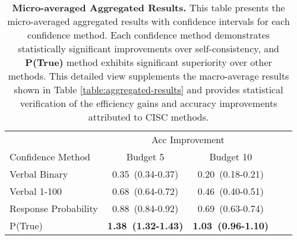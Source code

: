 \begin{table*}[!ht]
\centering
\begin{tabular}{lcccc}
\toprule
& \multicolumn{2}{c}{Acc Improvement} \\
\cmidrule(lr){2-3} \cmidrule(l){4-5} 
Confidence Method & Budget 5 & Budget 10 \\
\midrule
Verbal Binary & 0.35\ \small{(0.34-0.37)} & 0.20\ \small{(0.18-0.21)} \\[4pt]
Verbal 1-100 & 0.68\ \small{(0.64-0.72)} & 0.46\ \small{(0.40-0.51)} \\[4pt]
Response Probability & 0.88\ \small{(0.84-0.92)} & 0.69\ \small{(0.63-0.74)} \\[4pt]
P(True) & \textbf{1.38\ \small{(1.32-1.43)}} & \textbf{1.03\ \small{(0.96-1.10)}} \\[4pt]

\bottomrule
\end{tabular}
\caption{\textbf{Micro-averaged Aggregated Results. } This table presents the micro-averaged aggregated results with confidence intervals for each confidence method. Each confidence method demonstrates statistically significant improvements over self-consistency, and \textbf{P(True)} method exhibits significant superiority over other methods. This detailed view supplements the macro-average results shown in Table \ref{table:aggregated-results} and provides statistical verification of the efficiency gains and accuracy improvements attributed to CISC methods. }
\label{table:micro-results}
\end{table*}

